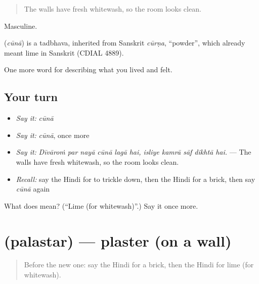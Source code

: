 \begin{quote}
The walls have fresh whitewash, so the room looks clean.
\end{quote}

Masculine.

\begin{cousinweb}
\textbf{} (\emph{cūnā}) is a tadbhava, inherited from Sanskrit \emph{cūrṇa}, \textquotedblleft{}powder\textquotedblright{}, which already meant lime in Sanskrit (CDIAL 4889).
\end{cousinweb}

\begin{grammarlens}[title={What you've built}]
One more word for describing what you lived and felt.
\end{grammarlens}

\subsection*{Your turn}
\begin{itemize}
\raggedright
  \item \emph{Say it:} \emph{cūnā}
  \item \emph{Say it:} \emph{cūnā}, once more
  \item \emph{Say it:} \emph{Dīvāroṁ par nayā cūnā lagā hai, isliye kamrā sāf dikhtā hai.} — The walls have fresh whitewash, so the room looks clean.
  \item \emph{Recall:} say the Hindi for to trickle down, then the Hindi for a brick, then say \emph{cūnā} again
\end{itemize}

\begin{tcolorbox}[breakable,colback=teal!4,colframe=teal!35!black,title={Before you move on}]
What does  mean? (\textquotedblleft{}Lime (for whitewash)\textquotedblright{}.) Say it once more.
\end{tcolorbox}
\section[\texorpdfstring{\hi{पलस्तर} (palastar)}{पलस्तर (palastar)}]{ (palastar) — plaster (on a wall)}

\label{lesson:HI-C517-palastar}



\begin{quote}
Before the new one: say the Hindi for a brick, then the Hindi for lime (for whitewash).
\end{quote}

